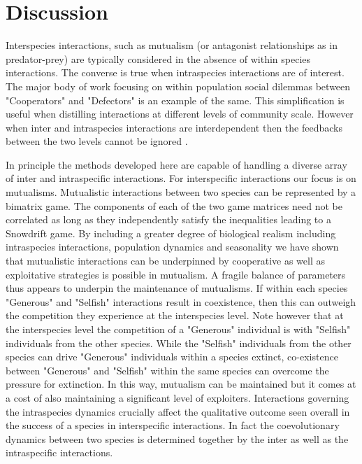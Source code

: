 \documentclass[12pt]{article}
\begin{document}
\section{Discussion}

Interspecies interactions, such as mutualism (or antagonist relationships as in predator-prey) are typically considered in the absence of within species interactions. The converse is true when intraspecies interactions are of interest. The major body of work focusing on within population social dilemmas between "Cooperators" and "Defectors" is an example of the same. This simplification is useful when distilling interactions at different levels of community scale. However when inter and intraspecies interactions are interdependent then the feedbacks between the two levels cannot be ignored \citep{schluter:PlosB:2012}.

In principle the methods developed here are capable of handling a diverse array of inter and intraspecific interactions. For interspecific interactions our focus is on mutualisms. Mutualistic interactions between two species can be represented by a bimatrix game. The components of each of the two game matrices need not be correlated as long as they independently satisfy the inequalities leading to a Snowdrift game. By including a greater degree of biological realism including intraspecies interactions, population dynamics and seasonality we have shown that mutualistic interactions can be underpinned by cooperative as well as exploitative strategies is possible in mutualism. A fragile balance of parameters thus appears to underpin the maintenance of mutualisms. If within each species "Generous" and "Selfish" interactions result in coexistence, then this can outweigh the competition they experience at the interspecies level. Note however that at the interspecies level the competition of a "Generous" individual is with "Selfish" individuals from the other species. While the "Selfish" individuals from the other species can drive "Generous" individuals within a species extinct, co-existence between "Generous" and "Selfish" within the same species can overcome the pressure for extinction. In this way, mutualism can be maintained but it comes at a cost of also maintaining a significant level of exploiters. Interactions governing the intraspecies dynamics crucially affect the qualitative outcome seen overall in the success of a species in interspecific interactions. In fact the coevolutionary dynamics between two species is determined together by the inter as well as the intraspecific interactions.
\end{document}
